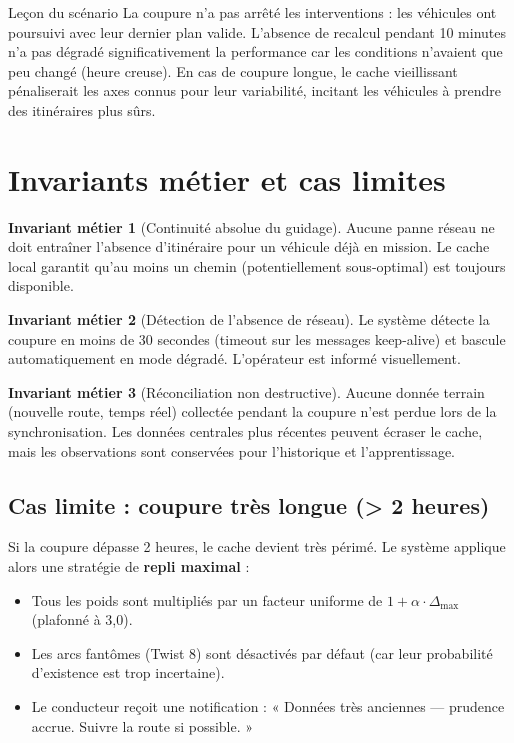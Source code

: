 \documentclass[12pt,a4paper]{article}
\theoremstyle{definition}
\newtheorem{invariant}{Invariant métier}[section]
\theoremstyle{remark}
\begin{document}
\begin{metierbox}{Leçon du scénario}
La coupure n’a pas arrêté les interventions : les véhicules ont
poursuivi avec leur dernier plan valide. L’absence de recalcul
pendant 10 minutes n’a pas dégradé significativement la performance
car les conditions n’avaient que peu changé (heure creuse). En cas
de coupure longue, le cache vieillissant pénaliserait les axes
connus pour leur variabilité, incitant les véhicules à prendre
des itinéraires plus sûrs.
\end{metierbox}

\newpage

\section{Invariants métier et cas limites}

\begin{invariant}[Continuité absolue du guidage]
Aucune panne réseau ne doit entraîner l’absence d’itinéraire pour
un véhicule déjà en mission. Le cache local garantit qu’au moins
un chemin (potentiellement sous-optimal) est toujours disponible.
\end{invariant}

\begin{invariant}[Détection de l’absence de réseau]
Le système détecte la coupure en moins de 30 secondes (timeout
sur les messages keep-alive) et bascule automatiquement en mode
dégradé. L’opérateur est informé visuellement.
\end{invariant}

\begin{invariant}[Réconciliation non destructive]
Aucune donnée terrain (nouvelle route, temps réel) collectée pendant
la coupure n’est perdue lors de la synchronisation. Les données
centrales plus récentes peuvent écraser le cache, mais les observations
sont conservées pour l’historique et l’apprentissage.
\end{invariant}

\subsection{Cas limite : coupure très longue (> 2 heures)}

Si la coupure dépasse 2 heures, le cache devient très périmé. Le
système applique alors une stratégie de \textbf{repli maximal} :
\begin{itemize}
  \item Tous les poids sont multipliés par un facteur uniforme de $1 + \alpha \cdot \Delta_{\max}$
        (plafonné à 3,0).
  \item Les arcs fantômes (Twist 8) sont désactivés par défaut
        (car leur probabilité d’existence est trop incertaine).
  \item Le conducteur reçoit une notification : « Données très
        anciennes — prudence accrue. Suivre la route si possible. »
\end{itemize}
\end{document}
